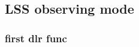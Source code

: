 \subsection{LSS observing mode}\label{sec:drl_functions_lss}

\subsubsection{first dlr func}\label{ssub:}




